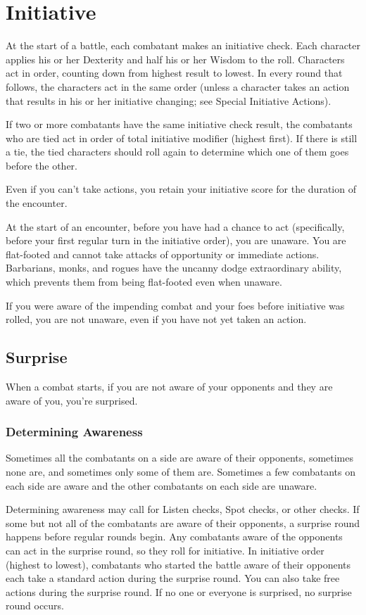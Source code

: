\section{Initiative}
 At the start of a battle, each combatant makes an initiative check. Each character applies his or her Dexterity and half his or her Wisdom to the roll. Characters act in order, counting down from highest result to lowest. In every round that follows, the characters act in the same order (unless a character takes an action that results in his or her initiative changing; see Special Initiative Actions).

If two or more combatants have the same initiative check result, the combatants who are tied act in order of total initiative modifier (highest first). If there is still a tie, the tied characters should roll again to determine which one of them goes before the other.

 Even if you can't take actions, you retain your initiative score for the duration of the encounter.

 At the start of an encounter, before you have had a chance to act (specifically, before your first regular turn in the initiative order), you are unaware. You are flat-footed and cannot take attacks of opportunity or immediate actions. Barbarians, monks, and rogues have the uncanny dodge extraordinary ability, which prevents them from being flat-footed even when unaware.

If you were aware of the impending combat and your foes before initiative was rolled, you are not unaware, even if you have not yet taken an action.

\subsection{Surprise}
When a combat starts, if you are not aware of your opponents and they are aware of you, you're surprised.

\subsubsection{Determining Awareness}
Sometimes all the combatants on a side are aware of their opponents, sometimes none are, and sometimes only some of them are. Sometimes a few combatants on each side are aware and the other combatants on each side are unaware.

Determining awareness may call for Listen checks, Spot checks, or other checks.
 If some but not all of the combatants are aware of their opponents, a surprise round happens before regular rounds begin. Any combatants aware of the opponents can act in the surprise round, so they roll for initiative. In initiative order (highest to lowest), combatants who started the battle aware of their opponents each take a standard action during the surprise round. You can also take free actions during the surprise round. If no one or everyone is surprised, no surprise round occurs.

